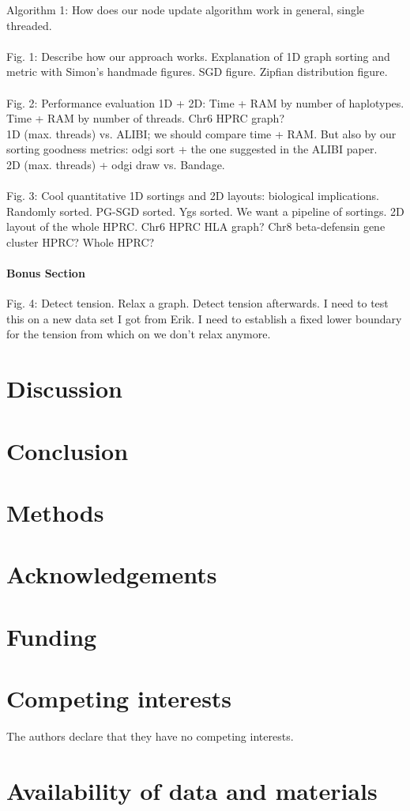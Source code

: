 \documentclass[11pt,hidelinks]{article}
\begin{document}
Algorithm 1: How does our node update algorithm work in general, single threaded.
\paragraph{}
Fig. 1: Describe how our approach works. Explanation of 1D graph sorting and metric with Simon's handmade figures. SGD figure. Zipfian distribution figure.
\paragraph{}
Fig. 2: Performance evaluation 1D + 2D: Time + RAM by number of haplotypes. Time + RAM by number of threads. Chr6 HPRC graph?
\\
1D (max. threads) vs. ALIBI; we should compare time + RAM. But also by our sorting goodness metrics: odgi sort + the one suggested in the ALIBI paper. 
\\
2D (max. threads) + odgi draw vs. Bandage.
\paragraph{}
Fig. 3: Cool quantitative 1D sortings and 2D layouts: biological implications. Randomly sorted. PG-SGD sorted. Ygs sorted. We want a pipeline of sortings. 2D layout of the whole HPRC. Chr6 HPRC HLA graph? Chr8 beta-defensin gene cluster HPRC? Whole HPRC?
\paragraph{Bonus Section}
Fig. 4: Detect tension. Relax a graph. Detect tension afterwards. I need to test this on a new data set I got from Erik. I need to establish a fixed lower boundary for the tension from which on we don't relax anymore.

\section{Discussion}

\section{Conclusion}

\section{Methods}




\section*{Acknowledgements}

\section*{Funding}

\section*{Competing interests}
The authors declare that they have no competing interests.

\section*{Availability of data and materials}
\end{document}
